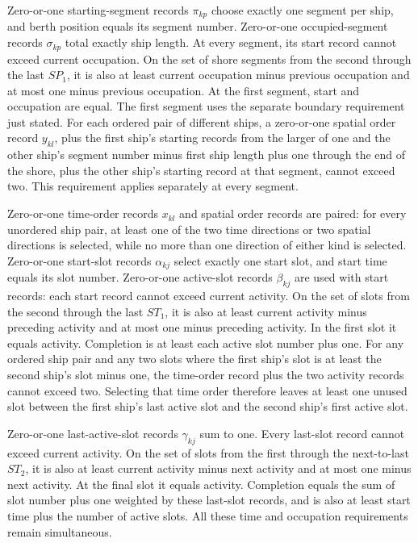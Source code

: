 \documentclass[10pt]{article}
\begin{document}
Zero-or-one starting-segment records $\pi_{kp}$ choose exactly one segment per ship, and berth position equals its segment number. Zero-or-one occupied-segment records $\sigma_{kp}$ total exactly ship length. At every segment, its start record cannot exceed current occupation. On the set of shore segments from the second through the last $SP_1$, it is also at least current occupation minus previous occupation and at most one minus previous occupation. At the first segment, start and occupation are equal. The first segment uses the separate boundary requirement just stated. For each ordered pair of different ships, a zero-or-one spatial order record $y_{kl}$, plus the first ship's starting records from the larger of one and the other ship's segment number minus first ship length plus one through the end of the shore, plus the other ship's starting record at that segment, cannot exceed two. This requirement applies separately at every segment.

Zero-or-one time-order records $x_{kl}$ and spatial order records are paired: for every unordered ship pair, at least one of the two time directions or two spatial directions is selected, while no more than one direction of either kind is selected. Zero-or-one start-slot records $\alpha_{kj}$ select exactly one start slot, and start time equals its slot number. Zero-or-one active-slot records $\beta_{kj}$ are used with start records: each start record cannot exceed current activity. On the set of slots from the second through the last $ST_1$, it is also at least current activity minus preceding activity and at most one minus preceding activity. In the first slot it equals activity. Completion is at least each active slot number plus one. For any ordered ship pair and any two slots where the first ship's slot is at least the second ship's slot minus one, the time-order record plus the two activity records cannot exceed two. Selecting that time order therefore leaves at least one unused slot between the first ship's last active slot and the second ship's first active slot.

Zero-or-one last-active-slot records $\gamma_{kj}$ sum to one. Every last-slot record cannot exceed current activity. On the set of slots from the first through the next-to-last $ST_2$, it is also at least current activity minus next activity and at most one minus next activity. At the final slot it equals activity. Completion equals the sum of slot number plus one weighted by these last-slot records, and is also at least start time plus the number of active slots. All these time and occupation requirements remain simultaneous.
\end{document}
